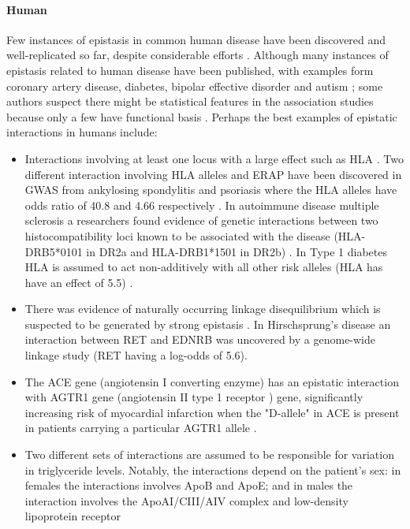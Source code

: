 \paragraph{Human}
Few instances of epistasis in common human disease have been discovered and well-replicated so far, despite considerable efforts \cite{zuk2012mystery}.
Although many instances of epistasis related to human disease have been published, with examples form coronary artery disease\cite{phillips2008epistasis:REF}, diabetes\cite{phillips2008epistasis:REF}, bipolar effective disorder\cite{phillips2008epistasis:REF} and autism \cite{phillips2008epistasis:REF}; some authors suspect there might be statistical features in the association studies because only a few have functional basis \cite{phillips2008epistasis}.
Perhaps the best examples of epistatic interactions in humans include:
\begin{itemize}
	\item Interactions involving at least one locus with a large effect such as HLA  \cite{zuk2012mystery}.
Two different interaction involving HLA alleles and ERAP have been discovered in GWAS from ankylosing spondylitis and psoriasis where the HLA alleles have odds ratio of 40.8 and 4.66 respectively \cite{zuk2012mystery:REF}.
In autoimmune disease multiple sclerosis a researchers found evidence of genetic interactions between two histocompatibility loci known to be associated with the disease (HLA-DRB5*0101 in DR2a and HLA-DRB1*1501 in DR2b) \cite{phillips2008epistasis:REF}. 
In Type 1 diabetes HLA is assumed to act non-additively with all other risk alleles (HLA has have an effect of 5.5) \cite{zuk2012mystery:REF}.

	\item There was evidence of naturally occurring linkage disequilibrium which is suspected to be generated by strong epistasis \cite{phillips2008epistasis}.
In Hirschsprung's disease an interaction between RET and EDNRB was uncovered by a genome-wide linkage study (RET having a log-odds of 5.6). \cite{zuk2012mystery:REF}

	\item The ACE gene (angiotensin I converting enzyme) has an epistatic interaction with AGTR1 gene (angiotensin II type 1 receptor ) gene, significantly increasing risk of myocardial infarction when the "D-allele" in ACE  is present in patients carrying a particular AGTR1 allele \cite{carlborg2004epistasis:REF}.

	\item Two different sets of interactions are assumed to be responsible for variation in triglyceride levels.
Notably, the interactions depend on the patient's sex: in females the interactions involves ApoB and ApoE;  and in males the interaction involves the ApoAI/CIII/AIV complex and low-density lipoprotein receptor \cite{culverhouse2002perspective:REF}


\end{itemize}
